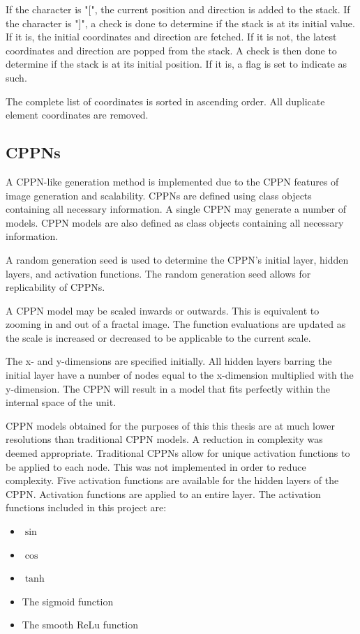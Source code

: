 If the character is "[", the current position and direction is added to the stack. If the character is "]", a check is done to determine if the stack is at its initial value. If it is, the initial coordinates and direction are fetched. If it is not, the latest coordinates and direction are popped from the stack. A check is then done to determine if the stack is at its initial position. If it is, a flag is set to indicate as such.

The complete list of coordinates is sorted in ascending order. All duplicate element coordinates are removed.

\subsection{CPPNs}
\label{ssec:CPPN}

A CPPN-like generation method is implemented due to the CPPN features of image generation and scalability. CPPNs are defined using class objects containing all necessary information. A single CPPN may generate a number of models. CPPN models are also defined as class objects containing all necessary information.

A random generation seed is used to determine the CPPN's initial layer, hidden layers, and activation functions. The random generation seed allows for replicability of CPPNs.

A CPPN model may be scaled inwards or outwards. This is equivalent to zooming in and out of a fractal image. The function evaluations are updated as the scale is increased or decreased to be applicable to the current scale.

The x- and y-dimensions are specified initially. All hidden layers barring the initial layer have a number of nodes equal to the x-dimension multiplied with the y-dimension. The CPPN will result in a model that fits perfectly within the internal space of the unit.

CPPN models obtained for the purposes of this this thesis are at much lower resolutions than traditional CPPN models. A reduction in complexity was deemed appropriate. Traditional CPPNs allow for unique activation functions to be applied to each node. This was not implemented in order to reduce complexity. Five activation functions are available for the hidden layers of the CPPN. Activation functions are applied to an entire layer. The activation functions included in this project are:

\begin{itemize}
	\item $\sin$
	\item $\cos$
	\item $\tanh$
	\item The sigmoid function
	\item The smooth ReLu function
\end{itemize}

